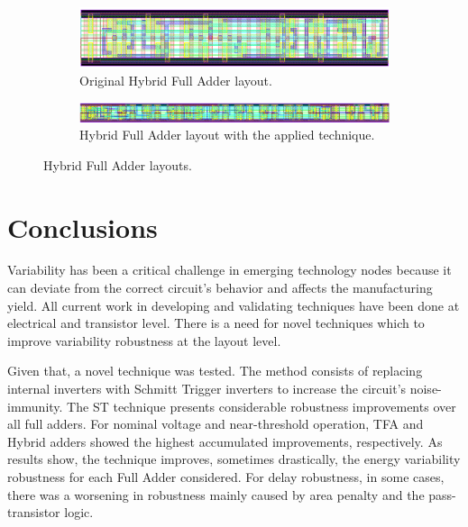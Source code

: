 \documentclass[ecp,tc, english]{iiufrgs}
\begin{document}
\begin{figure}[H]
  \centering
  \begin{subfigure}{\linewidth}
    \centering
    \includegraphics[width=\linewidth]{HYBRID.png}
    \caption{Original Hybrid Full Adder layout.}
  \end{subfigure}

  \begin{subfigure}{\linewidth}
    \centering
    \includegraphics[width=\linewidth]{HYBRIDST.png}
    \caption{Hybrid Full Adder layout with the applied technique.}
  \end{subfigure}  
  \caption{Hybrid Full Adder layouts.}
  \label{HYBRID}
\end{figure}

\chapter{Conclusions}

Variability has been a critical challenge in emerging technology nodes because it can deviate from the correct circuit's behavior and affects the manufacturing yield. All current work in developing and validating techniques have been done at electrical and transistor level. There is a need for novel techniques which to improve variability robustness at the layout level.

Given that, a novel technique was tested. The method consists of replacing internal inverters with Schmitt Trigger inverters to increase the circuit’s noise-immunity. The ST technique presents considerable robustness improvements over all full adders. For nominal voltage and near-threshold operation, TFA and Hybrid adders showed the highest accumulated improvements, respectively. As results show, the technique improves, sometimes drastically, the energy variability robustness for each Full Adder considered. For delay robustness, in some cases, there was a worsening in robustness mainly caused by area penalty and the pass-transistor logic. 
\end{document}

